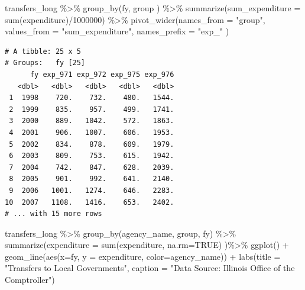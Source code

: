 \documentclass[
  letterpaper,
  DIV=11,
  numbers=noendperiod]{scrreport}
\newenvironment{Shaded}{\begin{snugshade}}{\end{snugshade}}
\newcommand{\AttributeTok}[1]{\textcolor[rgb]{0.40,0.45,0.13}{#1}}
\newcommand{\ConstantTok}[1]{\textcolor[rgb]{0.56,0.35,0.01}{#1}}
\newcommand{\DecValTok}[1]{\textcolor[rgb]{0.68,0.00,0.00}{#1}}
\newcommand{\FunctionTok}[1]{\textcolor[rgb]{0.28,0.35,0.67}{#1}}
\newcommand{\NormalTok}[1]{\textcolor[rgb]{0.00,0.23,0.31}{#1}}
\newcommand{\SpecialCharTok}[1]{\textcolor[rgb]{0.37,0.37,0.37}{#1}}
\newcommand{\StringTok}[1]{\textcolor[rgb]{0.13,0.47,0.30}{#1}}
\begin{document}
\begin{Shaded}
\begin{Highlighting}[]
\NormalTok{transfers\_long }\SpecialCharTok{\%\textgreater{}\%} 
  \FunctionTok{group\_by}\NormalTok{(fy, group ) }\SpecialCharTok{\%\textgreater{}\%}
  \FunctionTok{summarize}\NormalTok{(}\AttributeTok{sum\_expenditure =} \FunctionTok{sum}\NormalTok{(expenditure)}\SpecialCharTok{/}\DecValTok{1000000}\NormalTok{) }\SpecialCharTok{\%\textgreater{}\%}
  \FunctionTok{pivot\_wider}\NormalTok{(}\AttributeTok{names\_from =} \StringTok{"group"}\NormalTok{, }\AttributeTok{values\_from =} \StringTok{"sum\_expenditure"}\NormalTok{, }\AttributeTok{names\_prefix =} \StringTok{"exp\_"}\NormalTok{ )}
\end{Highlighting}
\end{Shaded}

\begin{verbatim}
# A tibble: 25 x 5
# Groups:   fy [25]
      fy exp_971 exp_972 exp_975 exp_976
   <dbl>   <dbl>   <dbl>   <dbl>   <dbl>
 1  1998    720.    732.    480.   1544.
 2  1999    835.    957.    499.   1741.
 3  2000    889.   1042.    572.   1863.
 4  2001    906.   1007.    606.   1953.
 5  2002    834.    878.    609.   1979.
 6  2003    809.    753.    615.   1942.
 7  2004    742.    847.    628.   2039.
 8  2005    901.    992.    641.   2140.
 9  2006   1001.   1274.    646.   2283.
10  2007   1108.   1416.    653.   2402.
# ... with 15 more rows
\end{verbatim}

\begin{Shaded}
\begin{Highlighting}[]
\NormalTok{transfers\_long }\SpecialCharTok{\%\textgreater{}\%} 
  \FunctionTok{group\_by}\NormalTok{(agency\_name, group, fy) }\SpecialCharTok{\%\textgreater{}\%} 
  \FunctionTok{summarize}\NormalTok{(}\AttributeTok{expenditure =} \FunctionTok{sum}\NormalTok{(expenditure, }\AttributeTok{na.rm=}\ConstantTok{TRUE}\NormalTok{) )}\SpecialCharTok{\%\textgreater{}\%} 
  \FunctionTok{ggplot}\NormalTok{() }\SpecialCharTok{+} 
  \FunctionTok{geom\_line}\NormalTok{(}\FunctionTok{aes}\NormalTok{(}\AttributeTok{x=}\NormalTok{fy, }\AttributeTok{y =}\NormalTok{ expenditure, }\AttributeTok{color=}\NormalTok{agency\_name)) }\SpecialCharTok{+} 
  \FunctionTok{labs}\NormalTok{(}\AttributeTok{title =} \StringTok{"Transfers to Local Governments"}\NormalTok{, }\AttributeTok{caption =} \StringTok{"Data Source: Illinois Office of the Comptroller"}\NormalTok{)}
\end{Highlighting}
\end{Shaded}
\end{document}
